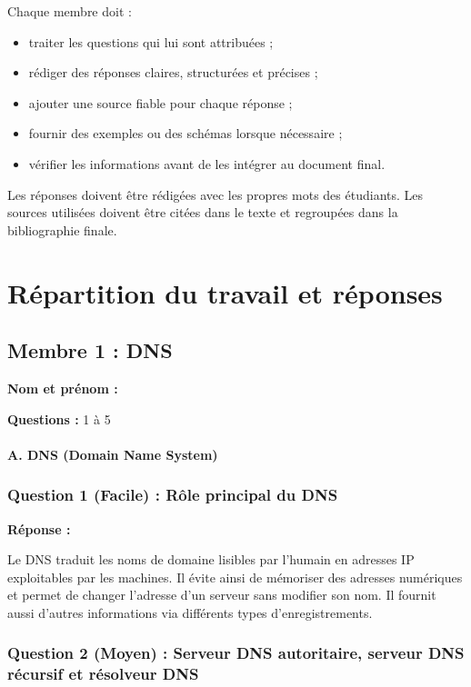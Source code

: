 \documentclass[12pt,a4paper]{article}
\newcommand{\membre}[2]{%
  \textbf{Nom et prénom :} #1 \par
  \textbf{Questions :} #2 \par
}
\newcommand{\reponse}{\textbf{Réponse :}\par}
\begin{document}
Chaque membre doit :
\begin{itemize}
    \item traiter les questions qui lui sont attribuées ;
    \item rédiger des réponses claires, structurées et précises ;
    \item ajouter une source fiable pour chaque réponse ;
    \item fournir des exemples ou des schémas lorsque nécessaire ;
    \item vérifier les informations avant de les intégrer au document final.
\end{itemize}

Les réponses doivent être rédigées avec les propres mots
des étudiants. Les sources utilisées doivent être citées
dans le texte et regroupées dans la bibliographie finale.

\section{Répartition du travail et réponses}

\subsection{Membre 1 : DNS}
\membre{\dotfill}{1 à 5}

\paragraph{A. DNS (Domain Name System)}

\subsubsection*{Question 1 (Facile) : Rôle principal du DNS}

\reponse
Le DNS traduit les noms de domaine lisibles par l'humain en adresses IP
exploitables par les machines. Il évite ainsi de mémoriser des adresses
numériques et permet de changer l'adresse d'un serveur sans modifier son
nom. Il fournit aussi d'autres informations via différents types
d'enregistrements.

\subsubsection*{Question 2 (Moyen) : Serveur DNS autoritaire, serveur DNS récursif et résolveur DNS}
\end{document}
